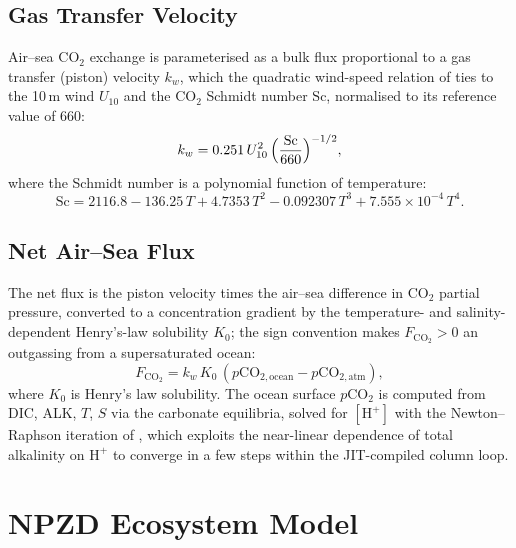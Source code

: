 \documentclass[11pt,twoside]{report}
\begin{document}
\subsection{Gas Transfer Velocity}

Air--sea CO$_2$ exchange is parameterised as a bulk flux proportional to a
gas transfer (piston) velocity $k_w$, which the quadratic wind-speed
relation of \citet{Wanninkhof2014} ties to the 10\,m wind $U_{10}$ and the
CO$_2$ Schmidt number $\mathrm{Sc}$, normalised to its reference value of
660:
\begin{equation}
  k_w = 0.251\,U_{10}^2\,\Bigl(\frac{\mathrm{Sc}}{660}\Bigr)^{-1/2},
\end{equation}
where the Schmidt number is a polynomial function of temperature:
\begin{equation}
  \mathrm{Sc} = 2116.8 - 136.25\,T + 4.7353\,T^2
  - 0.092307\,T^3 + 7.555\times10^{-4}\,T^4.
\end{equation}

\subsection{Net Air--Sea Flux}

The net flux is the piston velocity times the air--sea difference in CO$_2$
partial pressure, converted to a concentration gradient by the
temperature- and salinity-dependent Henry's-law solubility $K_0$; the sign
convention makes $F_{\mathrm{CO}_2}>0$ an outgassing from a supersaturated
ocean:
\begin{equation}
  F_{\mathrm{CO}_2} = k_w\,K_0\,
  (p\mathrm{CO}_{2,\mathrm{ocean}} - p\mathrm{CO}_{2,\mathrm{atm}}),
\end{equation}
where $K_0$ is Henry's law solubility.  The ocean surface $p$CO$_2$ is
computed from DIC, ALK, $T$, $S$ via the carbonate equilibria, solved for
$[\mathrm{H}^+]$ with the Newton--Raphson iteration of \citet{Follows2006},
which exploits the near-linear dependence of total alkalinity on $\mathrm{H}^+$
to converge in a few steps within the JIT-compiled column loop.


\section{NPZD Ecosystem Model}
\label{sec:npzd}
\end{document}
